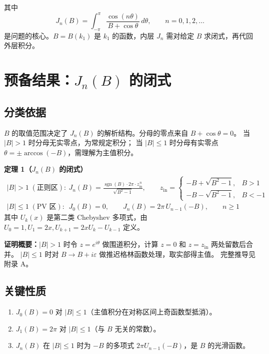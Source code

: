 \documentclass[12pt,a4paper]{ctexart}
\begin{document}
其中
\begin{equation}\label{eq:Jn}
J_n(B)=\int_{-\pi}^{\pi}\frac{\cos(n\theta)}{B+\cos\theta}\,d\theta,\qquad n=0,1,2,\dots
\end{equation}
是问题的核心。$B=B(k_1)$ 是 $k_1$ 的函数，内层 $J_n$ 需对给定 $B$ 求闭式，再代回外层积分。

\section{预备结果：$J_n(B)$ 的闭式}

\subsection{分类依据}

$B$ 的取值范围决定了 $J_n(B)$ 的解析结构。分母的零点来自 $B+\cos\theta=0$。
当 $|B|>1$ 时分母无实零点，为常规定积分；
当 $|B|\leq1$ 时分母有实零点 $\theta=\pm\arccos(-B)$，需理解为主值积分。

\textbf{定理 1（$J_n(B)$ 的闭式）}
\begin{equation}\label{eq:Jn_result}
\boxed{
\begin{aligned}
|B|>1\;(\text{正则区}):&\quad
J_n(B)=\frac{\operatorname{sgn}(B)\cdot2\pi\cdot z_{\text{in}}^{\,n}}{\sqrt{B^2-1}},\qquad
z_{\text{in}}=\begin{cases}-B+\sqrt{B^2-1},&B>1\\-B-\sqrt{B^2-1},&B<-1\end{cases}\\[8pt]
|B|\leq1\;(\text{PV 区}):&\quad
J_0(B)=0,\qquad J_n(B)=2\pi\,U_{n-1}(-B),\qquad n\geq1
\end{aligned}}
\end{equation}
其中 $U_k(x)$ 是第二类 Chebyshev 多项式，由 $U_0=1,U_1=2x,U_{k+1}=2xU_k-U_{k-1}$ 定义。

\textbf{证明概要：}$|B|>1$ 时令 $z=e^{i\theta}$ 做围道积分，计算 $z=0$ 和 $z=z_{\text{in}}$ 两处留数后合并。
$|B|\leq1$ 时对 $B\to B+i\varepsilon$ 做推迟格林函数处理，取实部得主值。
完整推导见附录 A。

\subsection{关键性质}

\begin{enumerate}
\item $J_0(B)=0$ 对 $|B|\leq1$（主值积分在对称区间上奇函数型抵消）。
\item $J_1(B)=2\pi$ 对 $|B|\leq1$（与 $B$ 无关的常数）。
\item $J_n(B)$ 在 $|B|\leq1$ 时为 $-B$ 的多项式 $2\pi U_{n-1}(-B)$，是 $B$ 的光滑函数。
\end{enumerate}
\end{document}
